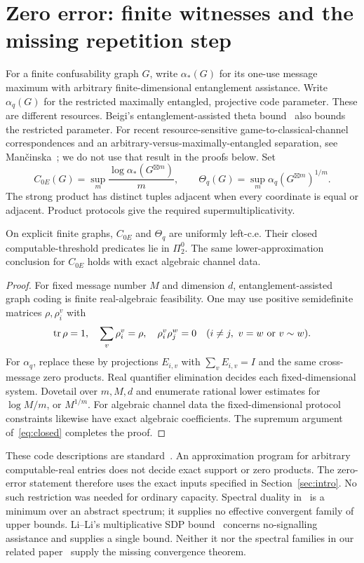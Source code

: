 \section{Zero error: finite witnesses and the missing repetition step}\label{sec:zeroerror}
For a finite confusability graph $G$, write $\alpha_*(G)$ for its
one-use message maximum with arbitrary finite-dimensional entanglement
assistance. Write $\alpha_q(G)$ for the restricted maximally entangled,
projective code parameter. These are different resources.
Beigi's entanglement-assisted theta bound~\cite{Beigi} also bounds the
restricted parameter. For recent resource-sensitive game-to-classical-channel
correspondences and an arbitrary-versus-maximally-entangled separation,
see Man\v{c}inska~\cite[Theorem~6 and Corollary~8]{Mancinska}; we do not
use that result in the proofs below. Set
\[
 C_{0E}(G)=\sup_m\frac{\log\alpha_*(G^{\boxtimes m})}{m},\qquad
 \Theta_q(G)=\sup_m\alpha_q(G^{\boxtimes m})^{1/m}.
\]
The strong product has distinct tuples adjacent when every coordinate
is equal or adjacent. Product protocols give the required
supermultiplicativity.

\begin{proposition}\label{prop:zerolower}
On explicit finite graphs, $C_{0E}$ and $\Theta_q$ are uniformly left-c.e.
Their closed computable-threshold predicates lie in $\Pi^0_2$.
The same lower-approximation conclusion for $C_{0E}$ holds with exact
algebraic channel data.
\end{proposition}
\begin{proof}
For fixed message number $M$ and dimension $d$, entanglement-assisted
graph coding is finite real-algebraic feasibility. One may use positive
semidefinite matrices $\rho,\rho_i^v$ with
\[
 \operatorname{tr}\rho=1,\quad \sum_v\rho_i^v=\rho,\quad
 \rho_i^v\rho_j^w=0\quad
 (i\ne j,\ v=w\text{ or }v\sim w).
\]
For $\alpha_q$, replace these by projections $E_{i,v}$ with
$\sum_vE_{i,v}=I$ and the same cross-message zero products.
Real quantifier elimination decides each fixed-dimensional system.
Dovetail over $m,M,d$ and enumerate rational lower estimates for
$\log M/m$, or $M^{1/m}$. For algebraic channel data the fixed-dimensional
protocol constraints likewise have exact algebraic coefficients.
The supremum argument of~\eqref{eq:closed} completes the proof.
\end{proof}
\begin{remark}
These code descriptions are standard~\cite{CLMW,MR,LZ}.
An approximation program for arbitrary computable-real entries does
not decide exact support or zero products. The zero-error statement
therefore uses the exact inputs specified in Section~\ref{sec:intro}.
No such restriction was needed for ordinary capacity. Spectral duality
in~\cite{LZ} is a minimum over an abstract spectrum; it supplies no
effective convergent family of upper bounds. Li--Li's multiplicative
SDP bound~\cite{LL} concerns no-signalling assistance and supplies a
single bound. Neither it nor the spectral families in our related
paper~\cite{MD} supply the missing convergence theorem.
\end{remark}

